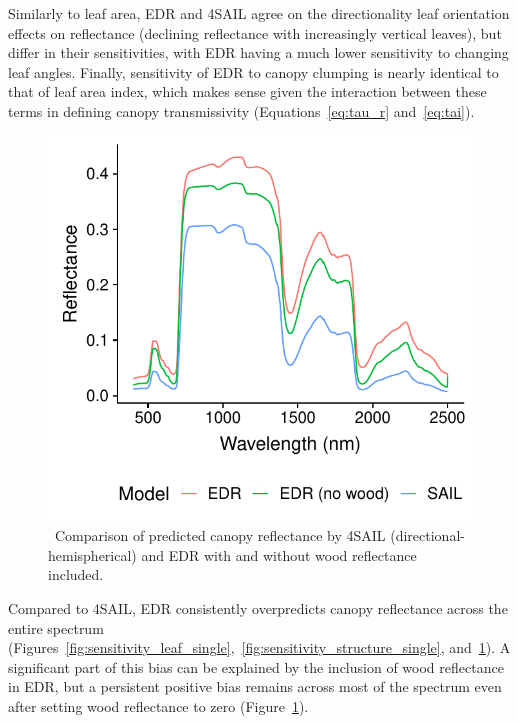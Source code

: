 Similarly to leaf area, EDR and 4SAIL agree on the directionality leaf orientation effects on reflectance (declining reflectance with increasingly vertical leaves), but differ in their sensitivities, with EDR having a much lower sensitivity to changing leaf angles.
Finally, sensitivity of EDR to canopy clumping is nearly identical to that of leaf area index, which makes sense given the interaction between these terms in defining canopy transmissivity (Equations~\ref{eq:tau_r} and~\ref{eq:tai}).

\begin{figure}
  \centering
  \includegraphics{4_edr/figures/explore_spectra/edr_wood_compare.pdf}
  \caption{\
    Comparison of predicted canopy reflectance by 4SAIL (directional-hemispherical) and EDR with and without wood reflectance included.
  }\label{fig:wood_compare}
\end{figure}

Compared to 4SAIL, EDR consistently overpredicts canopy reflectance across the entire spectrum (Figures~\ref{fig:sensitivity_leaf_single},~\ref{fig:sensitivity_structure_single}, and~\ref{fig:wood_compare}).
A significant part of this bias can be explained by the inclusion of wood reflectance in EDR, but a persistent positive bias remains across most of the spectrum even after setting wood reflectance to zero (Figure~\ref{fig:wood_compare}).

